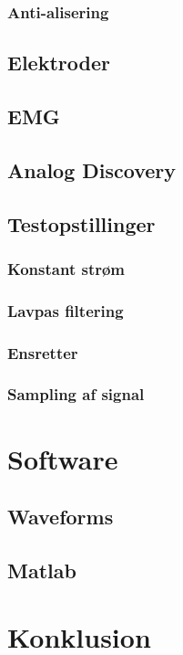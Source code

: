 \documentclass[main.tex]{subfiles}
\begin{document}
\subsection{Anti-alisering}
\section{Elektroder}
\section{EMG}
\section{Analog Discovery}
\section{Testopstillinger}
\subsection{Konstant strøm}
\subsection{Lavpas filtering}
\subsection{Ensretter}
\subsection{Sampling af signal}




\chapter{Software}
\section{Waveforms}
\section{Matlab}

\chapter{Konklusion}


\end{document}
